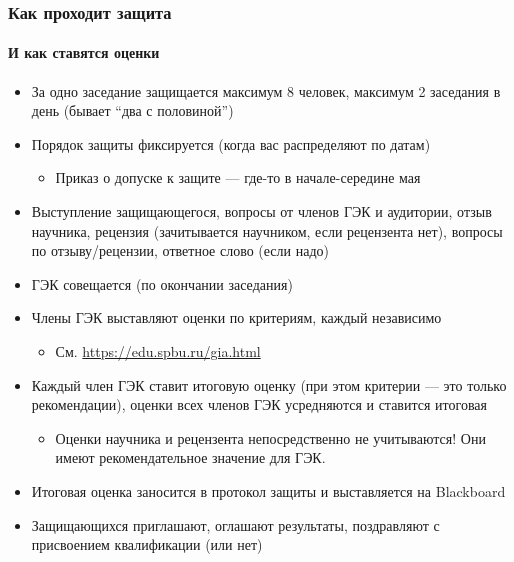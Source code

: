 \documentclass[xetex,mathserif,serif]{beamer}
\begin{document}
    \begin{frame}
        \frametitle{Как проходит защита}
        \framesubtitle{И как ставятся оценки}
        \begin{footnotesize}
            \begin{itemize}
                \item За одно заседание защищается максимум 8 человек, максимум 2 заседания в день (бывает \enquote{два с половиной})
                \item Порядок защиты фиксируется (когда вас распределяют по датам)
                \begin{itemize}
                    \item \footnotesize{Приказ о допуске к защите --- где-то в начале-середине мая}
                \end{itemize}
                \item Выступление защищающегося, вопросы от членов ГЭК и аудитории, отзыв научника, рецензия (зачитывается научником, если рецензента нет), вопросы по отзыву/рецензии, ответное слово (если надо)
                \item ГЭК совещается (по окончании заседания)
                \item Члены ГЭК выставляют оценки по критериям, каждый независимо
                \begin{itemize}
                    \item \footnotesize{См. \url{https://edu.spbu.ru/gia.html}}
                \end{itemize}
                \item Каждый член ГЭК ставит итоговую оценку (при этом критерии --- это только рекомендации), оценки всех членов ГЭК усредняются и ставится итоговая
                \begin{itemize}
                    \item \footnotesize{Оценки научника и рецензента непосредственно не учитываются! Они имеют рекомендательное значение для ГЭК.}
                \end{itemize}
                \item Итоговая оценка заносится в протокол защиты и выставляется на Blackboard
                \item Защищающихся приглашают, оглашают результаты, поздравляют с присвоением квалификации (или нет)
            \end{itemize}
        \end{footnotesize}
    \end{frame}
\end{document}
